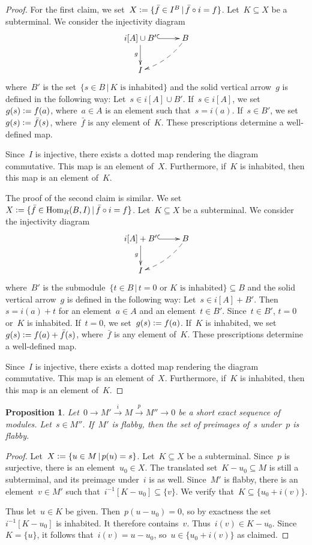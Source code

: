 \documentclass[oneside]{amsart}
\theoremstyle{definition}
\theoremstyle{plain}
\newtheorem{prop}[defn]{Proposition}
\theoremstyle{remark}
\newcommand{\xra}[1]{\xrightarrow{#1}}
\newcommand{\defeq}{\vcentcolon=}
\DeclareMathOperator{\Hom}{Hom}
\renewcommand{\_}{\mathpunct{.}\,}
\begin{document}
\begin{proof}For the first claim, we set~$X \defeq \{ \bar{f} \in I^B \,|\, \bar{f} \circ i =
f \}$. Let~$K \subseteq X$ be a subterminal. We consider the injectivity diagram
\[ \xymatrix{
  i[A] \cup B' \ar@{^{(}->}[r]\ar[d]_g & B \ar@{-->}@/^/[ld] \\
  I
} \]
where~$B'$ is the set~$\{ s \in B \,|\, \text{$K$ is inhabited} \}$ and the solid
vertical arrow~$g$ is defined in the following way: Let~$s \in i[A] \cup B'$.
If~$s \in i[A]$, we set~$g(s) \defeq f(a)$, where~$a \in A$ is an element such
that~$s = i(a)$. If~$s \in B'$, we set~$g(s) \defeq \bar{f}(s)$,
where~$\bar{f}$ is any element of~$K$. These prescriptions determine a well-defined
map.

Since~$I$ is injective, there exists a dotted map rendering the diagram
commutative. This map is an element of~$X$. Furthermore, if~$K$ is inhabited,
then this map is an element of~$K$.

The proof of the second claim is similar. We
set~$X \defeq \{ \bar{f} \in \Hom_R(B,I) \,|\, \bar{f} \circ i =
f \}$. Let~$K \subseteq X$ be a subterminal. We consider the injectivity diagram
\[ \xymatrix{
  i[A] + B' \ar@{^{(}->}[r]\ar[d]_g & B \ar@{-->}@/^/[ld] \\
  I
} \]
where~$B'$ is the submodule~$\{ t \in B \,|\, \text{$t = 0$ or $K$ is
inhabited} \} \subseteq B$ and the solid vertical arrow~$g$ is defined in the following
way: Let~$s \in i[A] + B'$. Then~$s = i(a) + t$ for an element~$a \in A$ and an
element~$t \in B'$. Since~$t \in B'$, $t = 0$ or~$K$ is inhabited. If~$t = 0$,
we set~$g(s) \defeq f(a)$. If~$K$ is inhabited, we set~$g(s) \defeq f(a) +
\bar{f}(s)$, where~$\bar{f}$ is any element of~$K$. These prescriptions
determine a well-defined map.

Since~$I$ is injective, there exists a dotted map rendering the diagram
commutative. This map is an element of~$X$. Furthermore, if~$K$ is inhabited,
then this map is an element of~$K$.
\end{proof}

\begin{prop}\label{prop:set-of-preimages-flabby}
Let~$0 \to M' \xra{i} M \xra{p} M'' \to 0$ be a short exact
sequence of modules. Let~$s \in M''$. If~$M'$ is flabby, then the set of
preimages of~$s$ under~$p$ is flabby.
\end{prop}

\begin{proof}Let~$X \defeq \{ u \in M \,|\, p(u) = s
\}$. Let~$K \subseteq X$ be a subterminal. Since~$p$ is surjective, there is an
element~$u_0 \in X$. The translated set~$K - u_0 \subseteq M$ is still a
subterminal, and its preimage under~$i$ is as well. Since~$M'$ is flabby, there
is an element~$v \in M'$ such that~$i^{-1}[K - u_0] \subseteq \{v\}$. We verify
that~$K \subseteq \{u_0 + i(v)\}$.

Thus let~$u \in K$ be given. Then~$p(u - u_0) = 0$, so by exactness the
set~$i^{-1}[K - u_0]$ is inhabited. It therefore contains~$v$. Thus~$i(v) \in K
- u_0$. Since~$K = \{u\}$, it follows that~$i(v) = u - u_0$, so~$u \in \{u_0 +
i(v)\}$ as claimed.
\end{proof}
\end{document}
